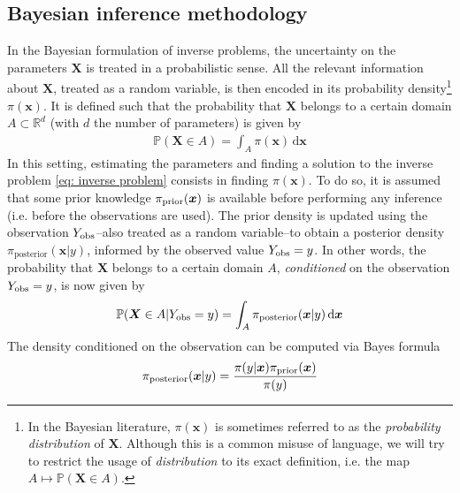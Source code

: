 \documentclass[draft]{agujournal2019}
\newcommand{\dd}{\mathrm{d}}
\begin{document}
\subsection{Bayesian inference methodology}
%
In the Bayesian formulation of inverse problems, the uncertainty on the parameters $\bm X$ is treated in a probabilistic sense. All the relevant information about $\bm X$, treated as a random variable, is then encoded in its probability density\footnote{In the Bayesian literature, $\pi (\bm x)$ is sometimes referred to as the \textit{probability distribution} of $\bm X$. Although this is a common misuse of language, we will try to restrict the usage of \textit{distribution} to its exact definition, i.e. the map $A\mapsto \mathbb{P}(\bm X \in A)$.} $\pi (\bm x)$. It is defined such that the probability that $\bm X$ belongs to a certain domain $A \subset \mathbb{R}^d$ (with $d$ the number of parameters) is given by
%
\begin{eqnarray*}
    \mathbb{P}(\bm X \in A) = \int_A \pi(\bm x) \, \dd \bm x
\end{eqnarray*}
In this setting, estimating the parameters and finding a solution to the inverse problem \eqref{eq: inverse problem} consists in finding $\pi (\bm x)$. 
To do so, it is assumed that some prior knowledge $\pi_{\rm prior}(\bm x)$ is available before performing any inference (i.e. before the observations are used).
%
The prior density is updated using the observation $Y_{\rm obs}$--also treated as a random variable--to obtain a posterior density $\pi_{\text{posterior}}(\bm x | y)$, informed by the observed value $Y_{\rm obs} = y$. In other words, the probability that $\bm X$ belongs to a certain domain $A$, \textit{conditioned} on the observation $Y_{\rm obs} = y$, is now given by
%
\begin{eqnarray*}
    \mathbb{P}(\bm X \in A | Y_{\rm obs} = y) = \int_A \pi_{\text{posterior}}(\bm x | y) \, \dd \bm x
\end{eqnarray*}
%
The density conditioned on the observation can be computed via Bayes formula
%
\begin{eqnarray*}
    \pi_{\rm posterior}(\bm x |y) = \frac{\pi(y|\bm x) \pi_{\rm prior}(\bm x)}{\pi(y)}
\end{eqnarray*}
%
\end{document}
